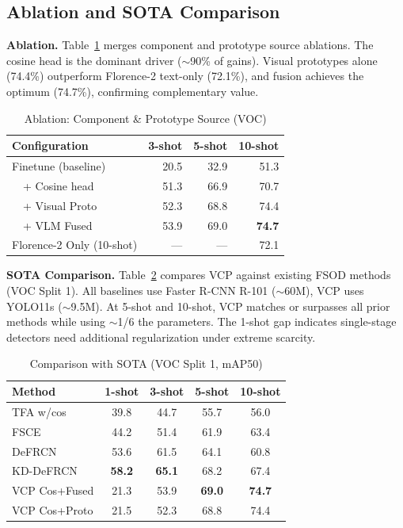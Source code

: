 \documentclass[conference]{IEEEtran}
\begin{document}
\subsection{Ablation and SOTA Comparison}

\textbf{Ablation.} Table~\ref{tab:ablation} merges component and prototype source ablations. The cosine head is the dominant driver ($\sim$90\% of gains). Visual prototypes alone (74.4\%) outperform Florence-2 text-only (72.1\%), and fusion achieves the optimum (74.7\%), confirming complementary value.

\begin{table}[ht]
\centering\footnotesize
\caption{Ablation: Component \& Prototype Source (VOC)}
\label{tab:ablation}
\begin{tabular}{lrrr}
\toprule
Configuration & 3-shot & 5-shot & 10-shot \\
\midrule
Finetune (baseline) & 20.5 & 32.9 & 51.3 \\
~~+ Cosine head    & 51.3 & 66.9 & 70.7 \\
~~+ Visual Proto   & 52.3 & 68.8 & 74.4 \\
~~+ VLM Fused      & 53.9 & 69.0 & \textbf{74.7} \\
Florence-2 Only (10-shot) & --- & --- & 72.1 \\
\bottomrule
\end{tabular}
\end{table}

\textbf{SOTA Comparison.} Table~\ref{tab:sota} compares VCP against existing FSOD methods (VOC Split 1). All baselines use Faster R-CNN R-101 ($\sim$60M), VCP uses YOLO11s ($\sim$9.5M). At 5-shot and 10-shot, VCP matches or surpasses all prior methods while using $\sim$1/6 the parameters. The 1-shot gap indicates single-stage detectors need additional regularization under extreme scarcity.

\begin{table}[ht]
\centering\footnotesize
\caption{Comparison with SOTA (VOC Split 1, mAP50)}
\label{tab:sota}
\begin{tabular}{lcccc}
\toprule
Method & 1-shot & 3-shot & 5-shot & 10-shot \\
\midrule
TFA w/cos        & 39.8 & 44.7 & 55.7 & 56.0 \\
FSCE             & 44.2 & 51.4 & 61.9 & 63.4 \\
DeFRCN           & 53.6 & 61.5 & 64.1 & 60.8 \\
KD-DeFRCN        & \textbf{58.2} & \textbf{65.1} & 68.2 & 67.4 \\
\midrule
VCP Cos+Fused    & 21.3 & 53.9 & \textbf{69.0} & \textbf{74.7} \\
VCP Cos+Proto    & 21.5 & 52.3 & 68.8 & 74.4 \\
\bottomrule
\end{tabular}
\end{table}
\end{document}
